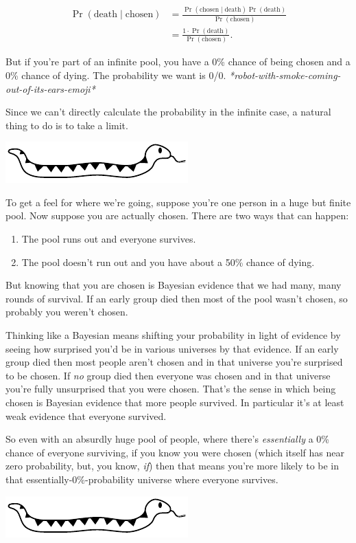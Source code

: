 \documentclass[article,twocolumn]{memoir}
\newcommand{\snakedivider}{
\vspace{.2em}
\begin{center}
\includegraphics[width=.25\linewidth]{cute-snake-divider}
\end{center}
\vspace{.1em}
}
\begin{document}
\begin{equation*}
\begin{split}
\Pr(\text{death} \mid \text{chosen}) & =
\frac{\Pr(\text{chosen} \mid \text{death}) \Pr(\text{death})}{\Pr(\text{chosen})} \\
& = \frac{1\cdot\Pr(\text{death})}{\Pr(\text{chosen})}.
\end{split}
\end{equation*}

But if you're part of an infinite pool, you have a 0\% chance of being chosen and a 0\% chance of dying. 
The probability we want is 0/0. 
\emph{*robot-with-smoke-coming-out-of-its-ears-emoji*}

Since we can't directly calculate the probability in the infinite case, a natural thing to do is to take a limit.

\snakedivider

To get a feel for where we're going, suppose you're one person in a huge but finite pool.
Now suppose you are actually chosen. 
There are two ways that can happen: 
\begin{enumerate}
\item The pool runs out and everyone survives.
\item The pool doesn't run out and you have about a 50\% chance of dying. 
\end{enumerate}
But knowing that you are chosen is Bayesian evidence that we had many, many rounds of survival. 
If an early group died then most of the pool wasn't chosen, so probably you weren't chosen.

Thinking like a Bayesian means shifting your probability in light of evidence by seeing how surprised you'd be in various universes by that evidence.
If an early group died then most people aren't chosen and in that universe you're surprised to be chosen. 
If \emph{no} group died then everyone was chosen and in that universe you're fully unsurprised that you were chosen. 
That's the sense in which being chosen is Bayesian evidence that more people survived. 
In particular it's at least weak evidence that everyone survived.

So even with an absurdly huge pool of people, where there's \emph{essentially} a 0\% chance of everyone surviving, if you know you were chosen (which itself has near zero probability, but, you know, \emph{if}) then that means you're more likely to be in that essentially-0\%-probability universe where everyone survives.

\snakedivider
\end{document}
